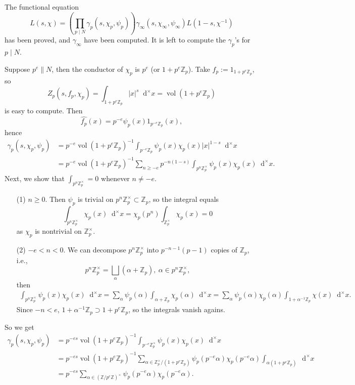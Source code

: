 \documentclass{article}
\theoremstyle{definition}
\theoremstyle{remark}
\renewcommand{\hat}{\widehat}
\newcommand{\Z}{\mathbb{Z}}
\newcommand{\dxm}{\mathop{}\!\mathrm{d}^{\times}x}
\DeclareMathOperator{\vol}{vol}
\begin{document}
The functional equation
\[L(s, \chi) = \left( \prod_{p\mid N}\gamma_p(s, \chi_p, \psi_p) \right)\gamma_\infty(s, \chi_\infty, \psi_\infty)L(1-s, \chi^{-1})\]has been proved, and $\gamma_\infty$ have been computed.
It is left to compute the $\gamma_p$'s for $p\mid N$.

Suppose $p^e\parallel N$,
then the conductor of $\chi_p$ is $p^e$ (or $1+p^e\Z_p$).
Take $f_p := 1_{1+p^e\Z_p}$, so
\[Z_p(s, f_p, \chi_p) = \int_{1+p^e\Z_p}|x|^s\dxm = \vol(1+p^e\Z_p)\]
is easy to compute.
Then \[\hat{f_p}(x) = p^{-e}\psi_p(x)1_{p^{-e}\Z_p}(x),\]
hence \begin{align*}
    \gamma_p(s, \chi_p, \psi_p) &= p^{-e}\vol(1+p^e\Z_p)^{-1} \int_{p^{-e}\Z_p}\psi_p(x)\chi_p(x)|x|^{1-s}\dxm\\
    &= p^{-e}\vol(1+p^e\Z_p)^{-1} \sum_{n\ge -e}p^{-n(1-s)}\int_{p^n\Z_p^\times}\psi_p(x)\chi_p(x)\dxm.
\end{align*}
Next, we show that $\int_{p^n\Z_p^\times} = 0$ whenever $n\ne -e$.
\begin{enumerate}
    \item [(1)] $n \ge 0$. Then $\psi_p$ is trivial on $p^n\Z_p^\times\subset\Z_p$, so the integral equals \[\int_{p^n\Z_p^\times}\chi_p(x)\dxm = \chi_p(p^n)\int_{\Z_p^\times}\chi_p(x) = 0\] as $\chi_p$ is nontrivial on $\Z_p^\times$.
    \item [(2)] $-e < n < 0$. We can decompose $p^n\Z_p^\times$ into $p^{-n-1}(p-1)$ copies of $\Z_p$, i.e., \[p^n\Z_p^\times = \bigsqcup_{\alpha}\left( \alpha+\Z_p \right),\ \alpha\in p^n\Z_p^\times,\]
    then\begin{align*}
        \int_{p^n\Z_p^\times}\psi_p(x)\chi_p(x)\dxm = \sum_{\alpha}\psi_p(\alpha)\int_{\alpha+\Z_p}\chi_p(\alpha)\dxm
        = \sum_{\alpha}\psi_p(\alpha)\chi_p(\alpha)\int_{1+\alpha^{-1}\Z_p}\chi(x)\dxm.
    \end{align*}
    Since $-n < e$, $1+\alpha^{-1}\Z_p\supset 1+p^e\Z_p$, so the integrals vanish agains.
\end{enumerate}
So we get \begin{align*}
    \gamma_p(s, \chi_p, \psi_p) &= p^{-es}\vol(1+p^e\Z_p)^{-1}\int_{p^{-e}\Z_p^\times} \psi_p(x)\chi_p(x)\dxm\\
    &= p^{-es}\vol(1+p^e\Z_p)^{-1}\sum_{\alpha\in \Z_p^\times/(1+p^e\Z_p)} \psi_p(p^{-e}\alpha)\chi_p(p^{-e}\alpha)\int_{\alpha(1+p^e\Z_p)}\dxm\\
    &= p^{-es}\sum_{\alpha\in (\Z/p^e\Z)^\times}\psi_p(p^{-e}\alpha)\chi_p(p^{-e}\alpha).
\end{align*}
\end{document}
